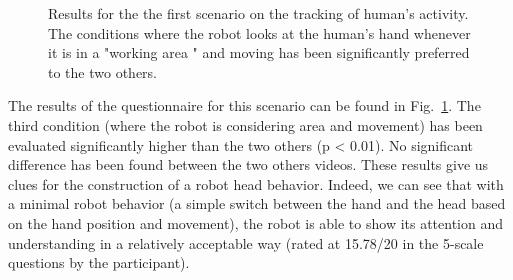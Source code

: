 \documentclass[english,a4paper,11pt,twoside]{StyleThese}
\begin{document}
\begin{figure}[!h]
\centering
	\hfill
    \caption{Results for the the first scenario on the tracking of human's activity. The conditions where the robot looks at the human's hand whenever it is in a "working area " and moving has been significantly preferred to the two others.}
    \label{fig:resSce2}
\end{figure}

The results of the questionnaire for this scenario can be found in Fig.~\ref{fig:resSce2}. The third condition (where the robot is considering area and movement) has been evaluated significantly higher than the two others (p < 0.01). No significant difference has been found between the two others videos. These results give us clues for the construction of a robot head behavior. Indeed, we can see that with a minimal robot behavior (a simple switch between the hand and the head based on the hand position and movement), the robot is able to show its attention and understanding in a relatively acceptable way (rated at 15.78/20 in the 5-scale questions by the participant).
\end{document}
